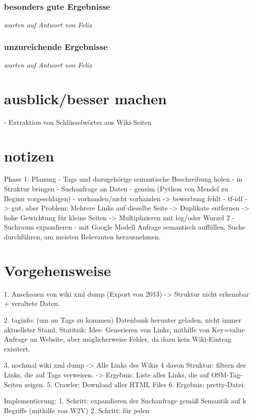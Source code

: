 \documentclass[12pt,pdftex,a4paper]{article}
\begin{document}
\subsubsection{besonders gute Ergebnisse}
\textit{warten auf Antwort von Felix}
\subsubsection{unzureichende Ergebnisse}
\textit{warten auf Antwort von Felix}


\section{ausblick/besser machen}
- Extraktion von Schlüsselwörter aus Wiki-Seiten


\section{notizen}
Phase 1: Planung
- Tags und dazugehörige semantische Beschreibung holen
- in Struktur bringen
- Suchanfrage an Daten 
- gensim (Python von Mendel zu Beginn vorgeschlagen)
- vorhanden/nicht vorhanden 
-> bewerbung fehlt
- tf-idf
-> gut, aber Problem: Mehrere Links auf dieselbe Seite
-> Duplikate entfernen
-> hohe Gewichtung für kleine Seiten
-> Multiplizieren mit log/oder Wurzel 2
- Suchraum expandieren
- mit Google Modell Anfrage semantisch auffüllen, Suche durchführen, am meisten Relevanten herausnehmen.


\pagebreak
\section{Vorgehensweise}

1. Anschauen von wiki xml dump (Export von 2013) 
-> Struktur nicht erkennbar + veraltete Daten.

2. taginfo: (um an Tags zu kommen) Datenbank herunter geladen, nicht immer aktuellster Stand, Statitsik: Idee: Generieren von Links, mithilfe von Key=value Anfrage an Website, aber möglicherweise Fehler, da dazu kein Wiki-Eintrag exisitert.

3. nochmal wiki xml dump -> Alle Links des Wikis
4  davon Struktur: filtern der Links, die auf Tags verweisen.
-> Ergebnis: Liste aller Links, die auf OSM-Tag-Seiten zeigen.
5. Crawler: Download aller HTML Files
6. Ergebnis: pretty-Datei.

Implementierung:
1. Schritt: expandieren der Suchanfrage gemäß Semantik auf k Begriffe (mithilfe von W2V) 
2. Schritt: für jeden 
\end{document}
